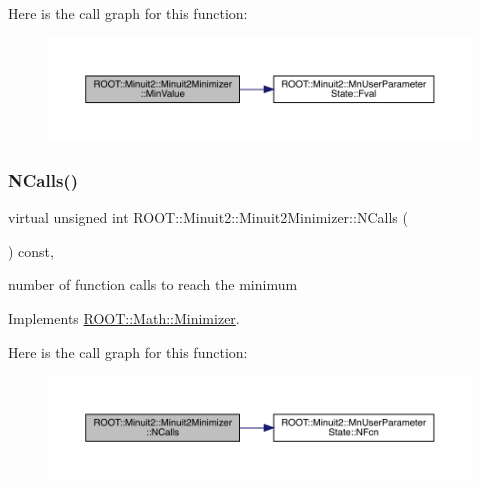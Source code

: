 Here is the call graph for this function\+:
\nopagebreak
\begin{figure}[H]
\begin{center}
\leavevmode
\includegraphics[width=350pt]{d0/d9c/classROOT_1_1Minuit2_1_1Minuit2Minimizer_a4a1c7fc174527aefab3d8c87bf8c0672_cgraph}
\end{center}
\end{figure}
\mbox{\label{classROOT_1_1Minuit2_1_1Minuit2Minimizer_ab5faf7c3dc0b3743eee8352c62a6ccfd}} 
\subsubsection{\texorpdfstring{NCalls()}{NCalls()}\hspace{0.1cm}{\footnotesize\ttfamily [1/3]}}
{\footnotesize\ttfamily virtual unsigned int R\+O\+O\+T\+::\+Minuit2\+::\+Minuit2\+Minimizer\+::\+N\+Calls (\begin{DoxyParamCaption}{ }\end{DoxyParamCaption}) const\hspace{0.3cm}{\ttfamily [inline]}, {\ttfamily [virtual]}}



number of function calls to reach the minimum 



Implements \mbox{\hyperlink{classROOT_1_1Math_1_1Minimizer_abf8b2e97d47843a1fde7a54cb51c1f0e}{R\+O\+O\+T\+::\+Math\+::\+Minimizer}}.

Here is the call graph for this function\+:
\nopagebreak
\begin{figure}[H]
\begin{center}
\leavevmode
\includegraphics[width=350pt]{d0/d9c/classROOT_1_1Minuit2_1_1Minuit2Minimizer_ab5faf7c3dc0b3743eee8352c62a6ccfd_cgraph}
\end{center}
\end{figure}
\mbox{\label{classROOT_1_1Minuit2_1_1Minuit2Minimizer_ab5faf7c3dc0b3743eee8352c62a6ccfd}} 
